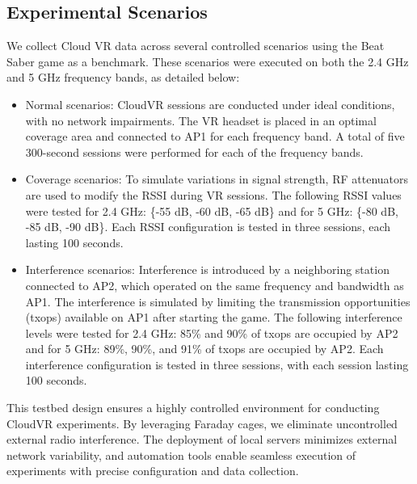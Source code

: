 \subsection{Experimental Scenarios}

We collect Cloud VR data across several controlled scenarios using the Beat Saber game as a benchmark. These scenarios were executed on both the 2.4 GHz and 5 GHz frequency bands, as detailed below:
\begin{itemize}
    \item Normal scenarios: CloudVR sessions are conducted under ideal conditions, with no network impairments. The VR headset is placed in an optimal coverage area and connected to AP1 for each frequency band. A total of five 300-second sessions were performed for each of the frequency bands.
    \item Coverage scenarios: To simulate variations in signal strength, RF attenuators are used to modify the \ac{RSSI} during VR sessions. The following RSSI values were tested for 2.4 GHz: \{-55 dB, -60 dB, -65 dB\} and for 5 GHz: \{-80 dB, -85 dB, -90 dB\}. Each RSSI configuration is tested in three sessions, each lasting 100 seconds.
    \item Interference scenarios: Interference is introduced by a neighboring station connected to AP2, which operated on the same frequency and bandwidth as AP1. The interference is simulated by limiting the transmission opportunities (txops) available on AP1 after starting the game. The following interference levels were tested for 2.4 GHz: 85\% and 90\% of txops are occupied by AP2 and for 5 GHz: 89\%, 90\%, and 91\% of txops are occupied by AP2. Each interference configuration is tested in three sessions, with each session lasting 100 seconds.
\end{itemize}


This testbed design ensures a highly controlled environment for conducting CloudVR experiments. By leveraging Faraday cages, we eliminate uncontrolled external radio interference. The deployment of local servers minimizes external network variability, and automation tools enable seamless execution of experiments with precise configuration and data collection.



